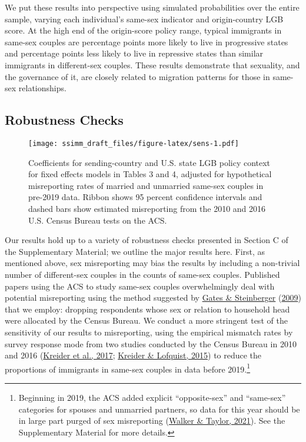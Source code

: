 \documentclass[
  12pt,
]{article}
\begin{document}
We put these results into perspective using simulated probabilities over the entire sample, varying each individual's same-sex indicator and origin-country LGB score. At the high end of the origin-score policy range, typical immigrants in same-sex couples are percentage points more likely to live in progressive states and percentage points less likely to live in repressive states than similar immigrants in different-sex couples. These results demonstrate that sexuality, and the governance of it, are closely related to migration patterns for those in same-sex relationships.

\hypertarget{robustness-checks}{%
\subsection{Robustness Checks}\label{robustness-checks}}

\begin{figure}
\centering
\texttt{[image: ssimm\_draft\_files/figure-latex/sens-1.pdf]}
\caption{\label{fig:sens}Coefficients for sending-country and U.S. state LGB policy context for fixed effects models in Tables 3 and 4, adjusted for hypothetical misreporting rates of married and unmarried same-sex couples in pre-2019 data. Ribbon shows 95 percent confidence intervals and dashed bars show estimated misreporting from the 2010 and 2016 U.S. Census Bureau tests on the ACS.}
\end{figure}

Our results hold up to a variety of robustness checks presented in Section C of the Supplementary Material; we outline the major results here. First, as mentioned above, sex misreporting may bias the results by including a non-trivial number of different-sex couples in the counts of same-sex couples. Published papers using the ACS to study same-sex couples overwhelmingly deal with potential misreporting using the method suggested by \protect\hyperlink{ref-gates_2009}{Gates \& Steinberger} (\protect\hyperlink{ref-gates_2009}{2009}) that we employ: dropping respondents whose sex or relation to household head were allocated by the Census Bureau. We conduct a more stringent test of the sensitivity of our results to misreporting, using the empirical mismatch rates by survey response mode from two studies conducted by the Census Bureau in 2010 and 2016 (\protect\hyperlink{ref-kreider_2017}{Kreider et al., 2017}; \protect\hyperlink{ref-kreider_2015}{Kreider \& Lofquist, 2015}) to reduce the proportions of immigrants in same-sex couples in data before 2019.\footnote{Beginning in 2019, the ACS added explicit ``opposite-sex'' and ``same-sex'' categories for spouses and unmarried partners, so data for this year should be in large part purged of sex misreporting (\protect\hyperlink{ref-walker_2021}{Walker \& Taylor, 2021}). See the Supplementary Material for more details.}
\end{document}
